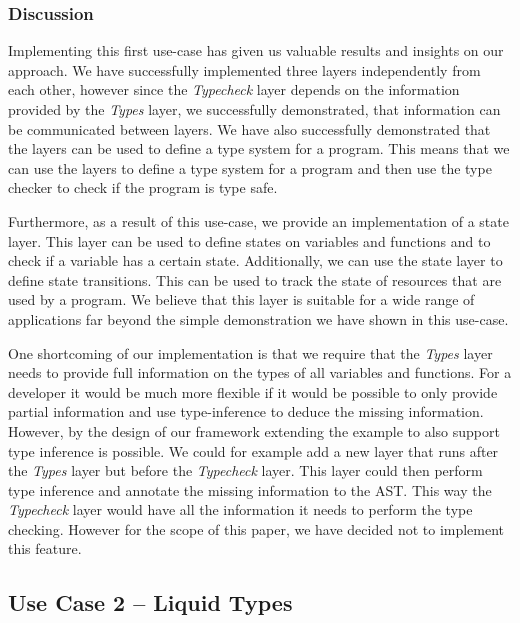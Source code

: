 \subsubsection{Discussion}

Implementing this first use-case has given us valuable results and insights on our approach. We have successfully implemented three layers independently from each other, however since the \textit{Typecheck} layer depends on the information provided by the \textit{Types} layer, we successfully demonstrated, that information can be communicated between layers. We have also successfully demonstrated that the layers can be used to define a type system for a program. This means that we can use the layers to define a type system for a program and then use the type checker to check if the program is type safe.

Furthermore, as a result of this use-case, we provide an implementation of a state layer. This layer can be used to define states on variables and functions and to check if a variable has a certain state. Additionally, we can use the state layer to define state transitions. This can be used to track the state of resources that are used by a program. We believe that this layer is suitable for a wide range of applications far beyond the simple demonstration we have shown in this use-case.

One shortcoming of our implementation is that we require that the \textit{Types} layer needs to provide full information on the types of all variables and functions. For a developer it would be much more flexible if it would be possible to only provide partial information and use type-inference to deduce the missing information. However, by the design of our framework extending the example to also support type inference is possible. We could for example add a new layer that runs after the \textit{Types} layer but before the \textit{Typecheck} layer. This layer could then perform type inference and annotate the missing information to the AST. This way the \textit{Typecheck} layer would have all the information it needs to perform the type checking. However for the scope of this paper, we have decided not to implement this feature.

\subsection{Use Case 2 -- Liquid Types}
\label{sssec:use_case_2}

